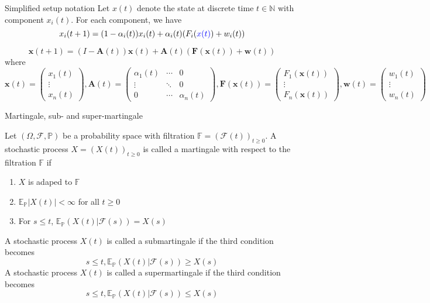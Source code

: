 \documentclass[aspectratio=169]{beamer} %
\begin{document}
\begin{frame}{Simplified setup notation}
Let $x(t)$ denote the state at discrete time $t\in\mathbb{N}$ with component $x_i(t)$. For each component, we have
\begin{equation}
    x_i(t+1) = (1-\alpha_i(t))x_i(t) + \alpha_i(t)(F_i(\textcolor{blue}{x(t)}) + w_i(t)) 
\end{equation}\label{eq:x_t}


    $$
    \mathbf{x}(t+1) =(I-\mathbf{A}(t)) \mathbf{x}(t) + \mathbf{A}(t)(\mathbf{F}(\mathbf{x}(t)) +\mathbf{w}(t))
    $$
    where
    $$
    \mathbf{x}(t) = \begin{pmatrix}
        x_1(t)\\
        \vdots\\
        x_n(t)
    \end{pmatrix},\mathbf{A}(t) = \begin{pmatrix}
        \alpha_1(t) &  \cdots & 0\\
        \vdots  & \ddots & 0\\
        0 &\cdots & \alpha_n(t)
    \end{pmatrix},\mathbf{F}(\mathbf{x}(t)) = \begin{pmatrix}
        F_1(\mathbf{x}(t))\\
        \vdots\\
        F_n(\mathbf{x}(t))
    \end{pmatrix},\mathbf{w}(t) = \begin{pmatrix}
        w_1(t)\\
        \vdots\\
        w_n(t)
    \end{pmatrix}
    $$
\end{frame}
\begin{frame}{Martingale, sub- and super-martingale}
\begin{definition}
    Let $(\Omega, \mathcal{F}, \mathbb{P})$ be a probability space with filtration $\mathbb{F} =(\mathcal{F}(t))_{t\ge 0}$. A stochastic process $X = (X(t))_{t\ge 0}$ is called a martingale with respect to the filtration $\mathbb{F}$ if
    \begin{enumerate}
        \item $X$ is adaped to $\mathbb{F}$
        \item $\mathbb{E}_{\mathbb{P}} |X(t)|<\infty$ for all $t\ge 0$
        \item For $s\le t$, $\mathbb{E}_{\mathbb{P}} (X(t)|\mathcal{F}(s)) = X(s)$
    \end{enumerate}
    A stochastic process $X(t)$ is called a submartingale if the third condition becomes
    $$
    s\le t, \mathbb{E}_{\mathbb{P}} (X(t)|\mathcal{F}(s))\ge X(s)
    $$
    A stochastic process $X(t)$ is called a supermartingale if the third condition becomes
    $$
    s\le t, \mathbb{E}_{\mathbb{P}} (X(t)|\mathcal{F}(s))\le X(s)
    $$
\end{definition}
    
\end{frame}
\end{document}
